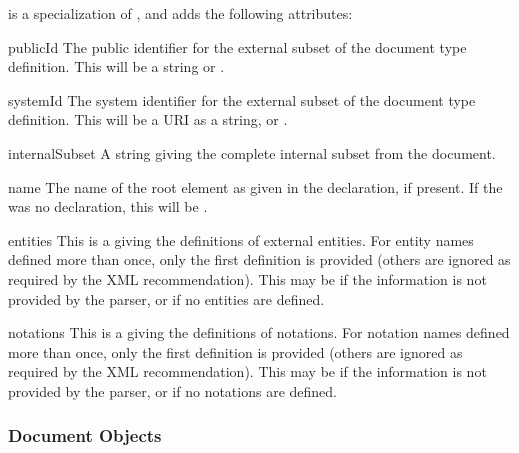  is a specialization of , and adds the
following attributes:

\begin{memberdesc}[DocumentType]{publicId}
  The public identifier for the external subset of the document type
  definition.  This will be a string or .
\end{memberdesc}

\begin{memberdesc}[DocumentType]{systemId}
  The system identifier for the external subset of the document type
  definition.  This will be a URI as a string, or .
\end{memberdesc}

\begin{memberdesc}[DocumentType]{internalSubset}
  A string giving the complete internal subset from the document.
\end{memberdesc}

\begin{memberdesc}[DocumentType]{name}
  The name of the root element as given in the 
  declaration, if present.  If the was no  declaration,
  this will be .
\end{memberdesc}

\begin{memberdesc}[DocumentType]{entities}
  This is a  giving the definitions of external
  entities.  For entity names defined more than once, only the first
  definition is provided (others are ignored as required by the XML
  recommendation).  This may be  if the information is not
  provided by the parser, or if no entities are defined.
\end{memberdesc}

\begin{memberdesc}[DocumentType]{notations}
  This is a  giving the definitions of notations.
  For notation names defined more than once, only the first definition
  is provided (others are ignored as required by the XML
  recommendation).  This may be  if the information is not
  provided by the parser, or if no notations are defined.
\end{memberdesc}


\subsubsection{Document Objects \label{dom-document-objects}}

